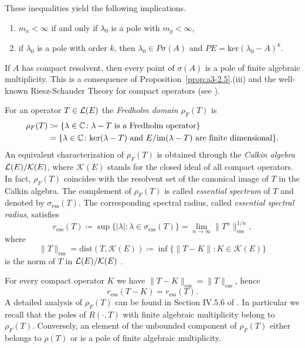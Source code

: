 \begin{example}
These inequalities yield the following implications.
\begin{enumerate}[\upshape (i)]
\item
$m_{a} < \infty$ if and only if $\lambda_{0}$ is a pole with $m_{g} < \infty$,
\item
if $\lambda_{0}$ is a pole with order $k$, then $\lambda_{0} \in P\sigma(A)$ and $PE = \text{ker}(\lambda_{0} - A)^{k}$.
\end{enumerate}
If $A$ has compact resolvent, then every point of $\sigma(A)$ is a pole of finite algebraic multiplicity.
This is a consequence of Proposition~\ref{prop:a3-2.5}.(iii) and the well-known Riesz-Schauder Theory for compact operators (see \citet[VII.4.5]{dunfordschwartz:1958}).
\end{example}
\begin{example}\label{subsec:a3-3.7}	
For an operator $T \in \mathcal{L}(E)$ the \emph{Fredholm domain} $\rho_{F}(T)$ is
\begin{equation}\label{eq:a3-3.5} 
\begin{aligned}
	\rho_{F}(T) & \coloneqq  \{\lambda \in \mathbb{C} \colon \lambda - T \text{ is a Fredholm operator}\}\\
	& =  \{\lambda \in \mathbb{C} \colon \text{ker}(\lambda - T) \text{ and }  E / \mathrm{im}(\lambda - T) \text{ are finite dimensional}\}.
\end{aligned}
\end{equation}
An equivalent characterization of $\rho_{F}(T)$ is obtained through the \emph{Calkin algebra} $\mathcal{L}(E)/\mathcal{K}(E)$, where $\mathcal{K}(E)$ stands for the closed ideal of all compact operators.
In fact, $\rho_{F}(T)$ coincides with the resolvent set of the canonical image of $T$ in the Calkin algebra.
The complement of $\rho_{F}(T)$ is called \emph{essential spectrum} of $T$ and denoted by $\sigma_{\text{ess}}(T)$.
The corresponding spectral radius, called \emph{essential spectral radius}, satisfies
\begin{equation}\label{eq:a3-3.6}
r_{\text{ess}}(T) \coloneqq \sup \{|\lambda| \colon \lambda \in \sigma_{\text{ess}}(T)\} = \lim_{n \to \infty} \|T^{n}\|_{\text{ess}}^{1/n} ,
\end{equation}
where 
%
\[
	\|T\|_{\text{ess}} = \text{dist}(T,\mathcal{K}(E)) \coloneqq \inf \{\|T - K\| \colon K \in \mathcal{K}(E)\}
\]
%
is the norm of $T$ in $\mathcal{L}(E)/\mathcal{K}(E)$ .

For every compact operator $K$ we have $\|T - K\|_{\text{ess}} = \|T\|_{\text{ess}}$, hence
\begin{equation}\label{eq:a3-3.7}
r_{\text{ess}}(T - K) = r_{\text{ess}}(T) .
\end{equation}
A detailed analysis of $\rho_{F}(T)$ can be found in Section IV.5.6 of \citet{kato:1966}.
In particular we recall that the poles of $R(\cdot,T)$ with finite algebraic multiplicity belong to $\rho_{F}(T)$.
Conversely, an element of the unbounded component of $\rho_{F}(T)$ either belongs to $\rho(T)$ or is a pole of finite algebraic multiplicity.


\end{example}
